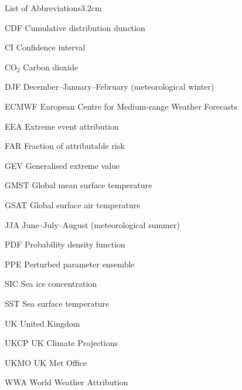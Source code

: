 \begin{mclistof}{List of Abbreviations}{3.2cm}

    \item[CDF] Cumulative distribution dunction
    \item[CI] Confidence interval 
    \item[CO$_2$] Carbon dioxide
    \item[DJF] December--January--February (meteorological winter)
    \item[ECMWF] European Centre for Medium-range Weather Forecasts
    \item[EEA] Extreme event attribution
    \item[FAR] Fraction of attributable risk
    \item[GEV] Generalised extreme value
    \item[GMST] Global mean surface temperature
    \item[GSAT] Global surface air temperature
    \item[JJA] June--July--August (meteorological summer)
    \item[PDF] Probability density function
    \item[PPE] Perturbed parameter ensemble
    \item[SIC] Sea ice concentration
    \item[SST] Sea surface temperature
    \item[UK] United Kingdom
    \item[UKCP] UK Climate Projections
    \item[UKMO] UK Met Office
    \item[WWA] World Weather Attribution

\end{mclistof}